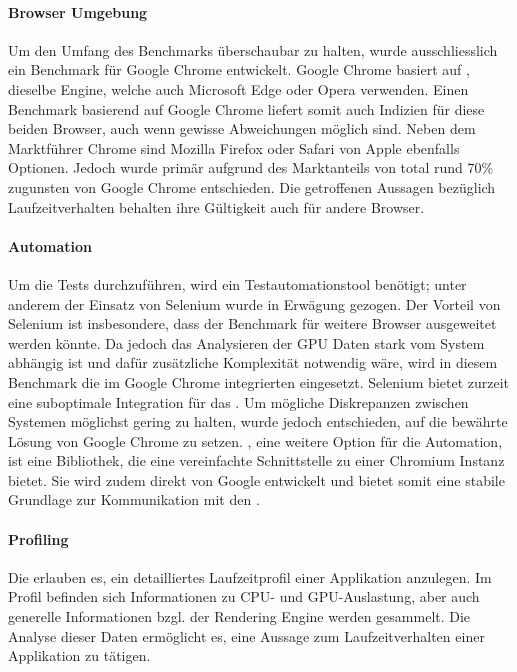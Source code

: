 \paragraph{Browser Umgebung}
Um den Umfang des Benchmarks überschaubar zu halten, wurde ausschliesslich ein Benchmark für Google Chrome entwickelt.
Google Chrome basiert auf , dieselbe Engine, welche auch Microsoft Edge oder Opera verwenden.
Einen Benchmark basierend auf Google Chrome liefert somit auch Indizien für diese beiden Browser, auch wenn gewisse Abweichungen möglich sind.
Neben dem Marktführer Chrome sind Mozilla Firefox oder Safari von Apple ebenfalls Optionen. Jedoch wurde primär aufgrund des Marktanteils von total rund 70\% \cite{browserUsage} zugunsten von Google Chrome entschieden.
Die getroffenen Aussagen bezüglich Laufzeitverhalten behalten ihre Gültigkeit auch für andere Browser.

\paragraph{Automation}
Um die Tests durchzuführen, wird ein Testautomationstool benötigt; unter anderem der Einsatz von Selenium wurde in Erwägung gezogen.
Der Vorteil von Selenium ist insbesondere, dass der Benchmark für weitere Browser ausgeweitet werden könnte.
Da jedoch das Analysieren der GPU Daten stark vom System abhängig ist und dafür zusätzliche Komplexität notwendig wäre, wird in diesem Benchmark die im Google Chrome integrierten  eingesetzt.
Selenium bietet zurzeit eine suboptimale Integration für das .
Um mögliche Diskrepanzen zwischen Systemen möglichst gering zu halten, wurde jedoch entschieden, auf die bewährte Lösung von Google Chrome zu setzen.
, eine weitere Option für die Automation, ist eine Bibliothek, die eine vereinfachte Schnittstelle zu einer Chromium Instanz bietet.
Sie wird zudem direkt von Google entwickelt und bietet somit eine stabile Grundlage zur Kommunikation mit den .

\paragraph{Profiling}
Die  erlauben es, ein detailliertes Laufzeitprofil einer Applikation anzulegen.
Im Profil befinden sich Informationen zu CPU- und GPU-Auslastung, aber auch generelle Informationen bzgl. der \gls{Rendering Engine} werden gesammelt.
Die Analyse dieser Daten ermöglicht es, eine Aussage zum Laufzeitverhalten einer Applikation zu tätigen.

